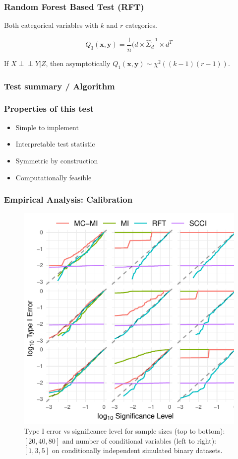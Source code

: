 \documentclass{beamer}
\def\ci{\perp\!\!\!\!\!\perp}
\begin{document}
\begin{frame}
	\frametitle{Random Forest Based Test (RFT)}
	Both categorical variables with $ k $ and $ r $ categories.


	$$ Q_3(\bm{x}, \bm{y}) = \frac{1}{n} (d \times \hat{\Sigma}_d^{-1} \times d^T $$

	If $ X \ci Y | Z $, then asymptotically $ Q_1(\bm{x}, \bm{y}) \sim
	\chi^2((k-1)(r-1)) $.
\end{frame}

\begin{frame}
	\frametitle{Test summary / Algorithm}

\end{frame}

\begin{frame}
	\frametitle{Properties of this test}
	\begin{itemize}
		\item Simple to implement
		\item Interpretable test statistic
		\item Symmetric by construction
		\item Computationally feasible
	\end{itemize}
\end{frame}


\begin{frame}
	\frametitle{Empirical Analysis: Calibration}
	\begin{figure}
		\centering
		\includegraphics[scale=0.8]{imgs/calibration_add_vars.pdf}
		\caption{Type I error vs significance level for sample sizes (top to
		bottom): $ [20, 40, 80] $ and number of conditional variables (left to
		right): $ [1, 3, 5] $ on conditionally independent simulated binary
		datasets.}
	\end{figure}
\end{frame}
\end{document}
